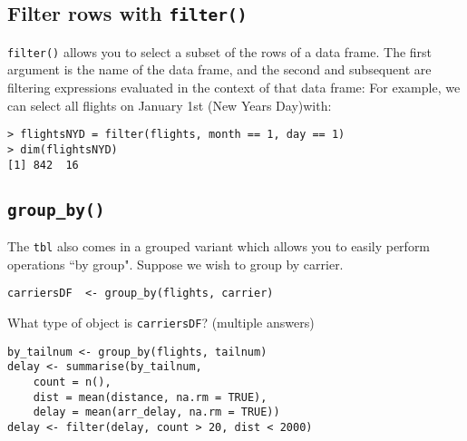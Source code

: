 \documentclass{article}
\begin{document}
\subsection{Filter rows with \texttt{filter()}}

\texttt{filter()} allows you to select a subset of the rows of a data frame. The first argument is the name of the data frame, and the second and subsequent are filtering expressions evaluated in the context of that data frame:
For example, we can select all flights on January 1st (New Years Day)with:

\begin{framed}
\begin{verbatim}
> flightsNYD = filter(flights, month == 1, day == 1)
> dim(flightsNYD)
[1] 842  16
\end{verbatim}
\end{framed}



\subsection{ \texttt{group\_by()}}

The \texttt{tbl} also comes in a grouped variant which allows you to easily perform operations ``by group". Suppose we wish to group by carrier.

\begin{verbatim}
carriersDF  <- group_by(flights, carrier)
\end{verbatim}

What type of object is \texttt{carriersDF}? (multiple answers)

\begin{framed}
\begin{verbatim}
by_tailnum <- group_by(flights, tailnum)
delay <- summarise(by_tailnum,
	count = n(),
	dist = mean(distance, na.rm = TRUE),
	delay = mean(arr_delay, na.rm = TRUE))
delay <- filter(delay, count > 20, dist < 2000)
\end{verbatim}
\end{framed}
\newpage
\end{document}
